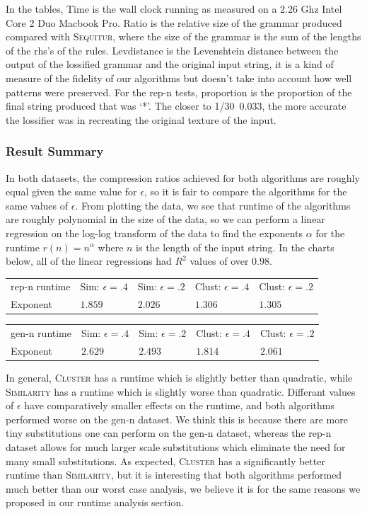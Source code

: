 \documentclass[11pt]{article}
\newcommand{\Sequitur}{\textsc{Sequitur}\xspace}
\newcommand{\Similarity}{\textsc{Similarity}\xspace}
\newcommand{\Cluster}{\textsc{Cluster}\xspace}
\begin{document}
In the tables, Time is the wall clock running as measured on a 2.26 Ghz Intel
Core 2 Duo Macbook Pro.  Ratio is the relative size of the grammar produced
compared with \Sequitur, where the size of the grammar is the sum of the
lengths of the rhs's of the rules. Levdistance is the Levenshtein distance
between the output of the lossified grammar and the original input string, it
is a kind of measure of the fidelity of our algorithms but doesn't take into
account how well patterns were preserved. For the rep-n tests, proportion is
the proportion of the final string produced that was `*'. The closer to
1/30~0.033, the more accurate the lossifier was in recreating the original
texture of the input.

\subsubsection{Result Summary}

In both datasets, the compression ratios achieved for both algorithms are
roughly equal given the same value for $\epsilon$, so it is fair to compare the
algorithms for the same values of $\epsilon$.  From plotting the data, we see
that runtime of the algorithms are roughly polynomial in the size of the data,
so we can perform a linear regression on the log-log transform of the data to
find the exponents $\alpha$ for the runtime $r(n)=n^\alpha$ where $n$ is the
length of the input string. In the charts below, all of the linear regressions
had $R^2$ values of over $0.98$.

\begin{tabular}{l|l|l|l|l}
rep-n runtime & Sim: $\epsilon=.4$ & Sim: $\epsilon=.2$ & Clust: $\epsilon = .4$ & Clust: $\epsilon = .2$ \\
Exponent      & $1.859$ & $2.026$ & $1.306$ & $1.305$
\end{tabular}

\begin{tabular}{l|l|l|l|l}
gen-n runtime & Sim: $\epsilon=.4$ & Sim: $\epsilon=.2$ & Clust: $\epsilon = .4$ & Clust: $\epsilon = .2$ \\
Exponent      & $2.629$ & $2.493$ & $1.814$ & $2.061$
\end{tabular}

In general, \Cluster has a runtime which is slightly better than quadratic,
while \Similarity has a runtime which is slightly worse than quadratic.
Differant values of $\epsilon$ have comparatively smaller effects on the
runtime, and both algorithms performed worse on the gen-n dataset. We think
this is because there are more tiny substitutions one can perform on
the gen-n dataset, whereas the rep-n dataset allows for much larger scale
substitutions which eliminate the need for many small substitutions.
As expected, \Cluster has a significantly better runtime than \Similarity,
but it is interesting that both algorithms performed much better than our
worst case analysis, we believe it is for the same reasons we proposed
in our runtime analysis section.
\end{document}
